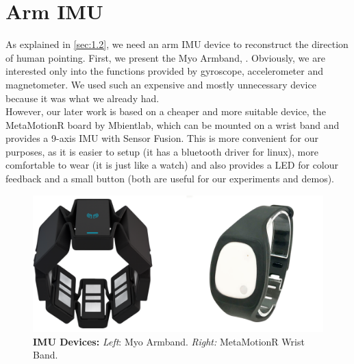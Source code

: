 \section{Arm IMU}
As explained in \ref{sec:1.2}, we need an arm IMU device to reconstruct the direction of human pointing. First, we present the Myo Armband, . Obviously, we are interested only into the functions provided by gyroscope, accelerometer and magnetometer. We used such an expensive and mostly unnecessary device because it was what we already had.\\ However, our later work is based on a cheaper and more suitable device, the MetaMotionR board by Mbientlab, which can be mounted on a wrist band and provides a 9-axis IMU with Sensor Fusion. This is more convenient for our purposes, as it is easier to setup (it has a bluetooth driver for linux), more comfortable to wear (it is just like a watch) and also provides a LED for colour feedback and a small button (both are useful for our experiments and demos).
\begin{figure}
	\centering
	\includegraphics[width=\textwidth]{img/IMUS.png}%
	\caption{\textbf{IMU Devices:} \emph{Left}: Myo Armband. \emph{Right:} MetaMotionR Wrist Band.}
	\label{fig:IMUS}
\end{figure}
